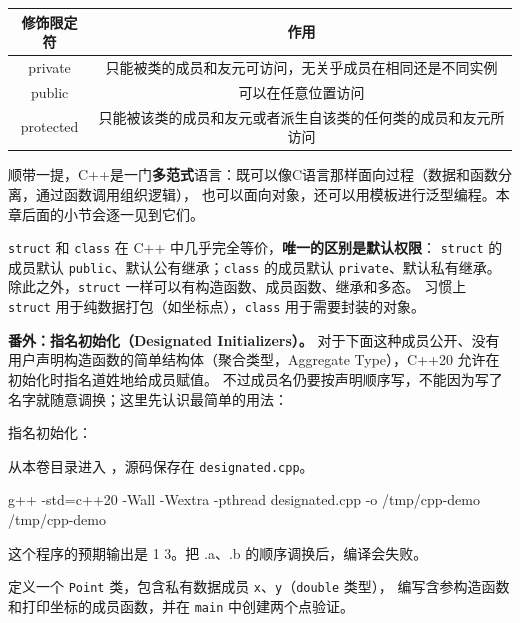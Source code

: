\begin{center}
    \begin{tabular}{cc}
        \toprule[1.5pt]
        修饰限定符 & 作用 \\
        \midrule[1pt]
        private & 只能被类的成员和友元可访问，无关乎成员在相同还是不同实例 \\
        public & 可以在任意位置访问 \\
        protected & 只能被该类的成员和友元或者派生自该类的任何类的成员和友元所访问\\
        \bottomrule[1.5pt]
    \end{tabular}
\end{center}

顺带一提，C++是一门\textbf{多范式}语言：既可以像C语言那样面向过程（数据和函数分离，通过函数调用组织逻辑），
也可以面向对象，还可以用模板进行泛型编程。本章后面的小节会逐一见到它们。

\begin{note}
\texttt{struct} 和 \texttt{class} 在 C++ 中几乎完全等价，\textbf{唯一的区别是默认权限}：
\texttt{struct} 的成员默认 \texttt{public}、默认公有继承；\texttt{class} 的成员默认 \texttt{private}、默认私有继承。
除此之外，\texttt{struct} 一样可以有构造函数、成员函数、继承和多态。
习惯上 \texttt{struct} 用于纯数据打包（如坐标点），\texttt{class} 用于需要封装的对象。
\end{note}

\textbf{番外：指名初始化（Designated Initializers）。}
对于下面这种成员公开、没有用户声明构造函数的简单结构体（聚合类型，Aggregate Type），C++20 允许在初始化时指名道姓地给成员赋值。
不过成员名仍要按声明顺序写，不能因为写了名字就随意调换；这里先认识最简单的用法：

\begin{example}
指名初始化：



从本卷目录进入 ，源码保存在 \texttt{designated.cpp}。
\begin{tbash}
g++ -std=c++20 -Wall -Wextra -pthread designated.cpp -o /tmp/cpp-demo
/tmp/cpp-demo
\end{tbash}
这个程序的预期输出是 1 3。把 .a、.b 的顺序调换后，编译会失败。
\end{example}

\begin{exercise}\label{ex:v1-cpp-point}

定义一个 \texttt{Point} 类，包含私有数据成员 \texttt{x}、\texttt{y}（\texttt{double} 类型），
编写含参构造函数和打印坐标的成员函数，并在 \texttt{main} 中创建两个点验证。
\end{exercise}

